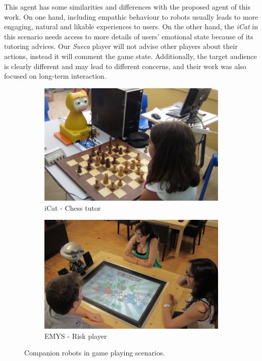This agent has some similarities and differences with the proposed agent of this work.
On one hand, including empathic behaviour to robots usually leads to more engaging, natural and likable experiences to users.
On the other hand, the \emph{iCat} in this scenario needs access to more details of users' emotional state because of its tutoring advices. Our \emph{Sueca} player will not advise other players about their actions, instead it will comment the game state.
Additionally, the target audience is clearly different and may lead to different concerns, and their work was also focused on long-term interaction.


\begin{figure}[h]
        \centering
        \begin{subfigure}[h]{0.48\textwidth}
                \includegraphics[width=\textwidth]{./img/icat}
                \caption{iCat - Chess tutor}
                \label{fig:icat}
        \end{subfigure}
        \begin{subfigure}[h]{0.5\textwidth}
                \includegraphics[width=\textwidth]{./img/emys}
                \caption{EMYS - Risk player}
                \label{fig:emys}
        \end{subfigure}
        \caption{Companion robots in game playing scenarios.}\label{fig:game-robots}
\end{figure}


